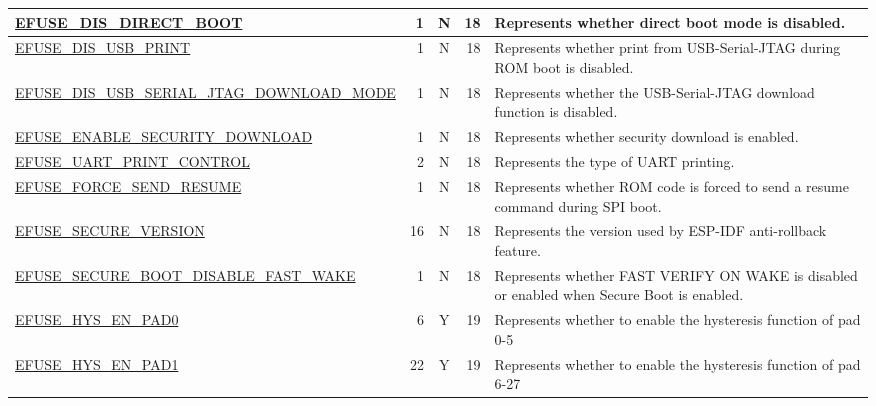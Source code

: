 \begin{longtable}[l]{ |m{8.2cm}|r|c|r|m{9cm}| }
    \hline
    \hyperref[fielddesc:EFUSEDISDIRECTBOOT]{EFUSE\_DIS\_DIRECT\_BOOT} & 1 & N & 18 & Represents whether direct boot mode is disabled.\\
    \hline
    \hyperref[fielddesc:EFUSEDISUSBPRINT]{EFUSE\_DIS\_USB\_PRINT} & 1 & N & 18 & Represents whether print from USB-Serial-JTAG during ROM boot is disabled.\\
    \hline
    \hyperref[fielddesc:EFUSEDISUSBSERIALJTAGDOWNLOADMODE]{EFUSE\_DIS\_USB\_SERIAL\_JTAG\_DOWNLOAD\_MODE} & 1 & N & 18 & Represents whether the USB-Serial-JTAG download function is disabled. \\
    \hline
    \hyperref[fielddesc:EFUSEENABLESECURITYDOWNLOAD]{EFUSE\_ENABLE\_SECURITY\_DOWNLOAD} & 1 & N & 18 & Represents whether security download is enabled. \\
    \hline
    \hyperref[fielddesc:EFUSEUARTPRINTCONTROL]{EFUSE\_UART\_PRINT\_CONTROL} & 2 & N & 18 & Represents the type of UART printing.\\
    \hline
    \hyperref[fielddesc:EFUSEFORCESENDRESUME]{EFUSE\_FORCE\_SEND\_RESUME} & 1 & N & 18 & Represents whether ROM code is forced to send a resume command during SPI boot. \\
    \hline
    \hyperref[fielddesc:EFUSESECUREVERSION]{EFUSE\_SECURE\_VERSION} & 16 & N & 18 & Represents the version used by ESP-IDF anti-rollback feature. \\\hline
    \hyperref[fielddesc:EFUSESECUREBOOTDISABLEFASTWAKE]{EFUSE\_SECURE\_BOOT\_DISABLE\_FAST\_WAKE} & 1 & N & 18 & Represents whether FAST VERIFY ON WAKE is disabled or enabled when Secure Boot is enabled.\\\hline
    \hyperref[fielddesc:EFUSEHYSENPAD0]{EFUSE\_HYS\_EN\_PAD0} & 6 & Y & 19 & Represents whether to enable the hysteresis function of pad 0-5\\\hline
    \hyperref[fielddesc:EFUSEHYSENPAD1]{EFUSE\_HYS\_EN\_PAD1} & 22 & Y & 19 & Represents whether to enable the hysteresis function of pad 6-27\\\hline
\end{longtable}